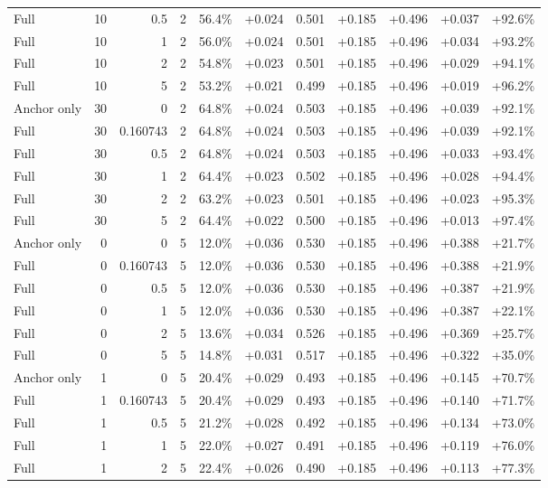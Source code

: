 \begin{table}[htbp]
\begin{tabular}{lrrrccccccc}
Full & 10 & 0.5 & 2 & 56.4\% & +0.024 & 0.501 & +0.185 & +0.496 & +0.037 & +92.6\% \\
Full & 10 & 1 & 2 & 56.0\% & +0.024 & 0.501 & +0.185 & +0.496 & +0.034 & +93.2\% \\
Full & 10 & 2 & 2 & 54.8\% & +0.023 & 0.501 & +0.185 & +0.496 & +0.029 & +94.1\% \\
Full & 10 & 5 & 2 & 53.2\% & +0.021 & 0.499 & +0.185 & +0.496 & +0.019 & +96.2\% \\
Anchor only & 30 & 0 & 2 & 64.8\% & +0.024 & 0.503 & +0.185 & +0.496 & +0.039 & +92.1\% \\
Full & 30 & 0.160743 & 2 & 64.8\% & +0.024 & 0.503 & +0.185 & +0.496 & +0.039 & +92.1\% \\
Full & 30 & 0.5 & 2 & 64.8\% & +0.024 & 0.503 & +0.185 & +0.496 & +0.033 & +93.4\% \\
Full & 30 & 1 & 2 & 64.4\% & +0.023 & 0.502 & +0.185 & +0.496 & +0.028 & +94.4\% \\
Full & 30 & 2 & 2 & 63.2\% & +0.023 & 0.501 & +0.185 & +0.496 & +0.023 & +95.3\% \\
Full & 30 & 5 & 2 & 64.4\% & +0.022 & 0.500 & +0.185 & +0.496 & +0.013 & +97.4\% \\
Anchor only & 0 & 0 & 5 & 12.0\% & +0.036 & 0.530 & +0.185 & +0.496 & +0.388 & +21.7\% \\
Full & 0 & 0.160743 & 5 & 12.0\% & +0.036 & 0.530 & +0.185 & +0.496 & +0.388 & +21.9\% \\
Full & 0 & 0.5 & 5 & 12.0\% & +0.036 & 0.530 & +0.185 & +0.496 & +0.387 & +21.9\% \\
Full & 0 & 1 & 5 & 12.0\% & +0.036 & 0.530 & +0.185 & +0.496 & +0.387 & +22.1\% \\
Full & 0 & 2 & 5 & 13.6\% & +0.034 & 0.526 & +0.185 & +0.496 & +0.369 & +25.7\% \\
Full & 0 & 5 & 5 & 14.8\% & +0.031 & 0.517 & +0.185 & +0.496 & +0.322 & +35.0\% \\
Anchor only & 1 & 0 & 5 & 20.4\% & +0.029 & 0.493 & +0.185 & +0.496 & +0.145 & +70.7\% \\
Full & 1 & 0.160743 & 5 & 20.4\% & +0.029 & 0.493 & +0.185 & +0.496 & +0.140 & +71.7\% \\
Full & 1 & 0.5 & 5 & 21.2\% & +0.028 & 0.492 & +0.185 & +0.496 & +0.134 & +73.0\% \\
Full & 1 & 1 & 5 & 22.0\% & +0.027 & 0.491 & +0.185 & +0.496 & +0.119 & +76.0\% \\
Full & 1 & 2 & 5 & 22.4\% & +0.026 & 0.490 & +0.185 & +0.496 & +0.113 & +77.3\% \\

\end{tabular}
\end{table}
